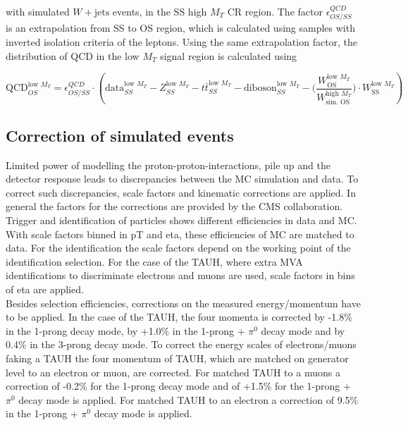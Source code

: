 with simulated $W + \text{jets}$ events, in the SS high $M_T$ CR region. The factor $\epsilon^{QCD}_{OS/SS}$ is an extrapolation from SS to OS region, which is calculated using samples with inverted isolation criteria of the leptons. Using the same extrapolation factor, the distribution of QCD in the low $M_T$ signal region is calculated using 

\begin{equation}
	\text{QCD}^{\text{low } M_T}_{OS} = \epsilon^{QCD}_{OS/SS} \cdot (\text{data}^{\text{low } M_T}_{SS} - Z^{\text{low } M_T}_{SS} - t\bar{t}^{\text{low } M_T}_{SS} - \text{diboson}^{\text{low } M_T}_{SS} -  \Bigg(\frac{W^{\text{low } M_T}_{\text{OS}}}{W^{\text{high } M_T}_{\text{sim. OS}}}\Bigg) \cdot W^{\text{low } M_T}_{\text{SS}})
\end{equation}


\subsection{Correction of simulated events}
\label{sec:section_3_4_3}

Limited power of modelling the proton-proton-interactions, pile up and the detector response leads to discrepancies between the \gls{MC} simulation and data. To correct such discrepancies, scale factors and kinematic corrections are applied. In general the factors for the corrections are provided by the \gls{CMS} collaboration. \\

Trigger and identification of particles shows different efficiencies in data and \gls{MC}. With scale factors binned in \gls{pT} and \gls{eta}, these efficiencies of \gls{MC} are matched to data. For the identification the scale factors depend on the working point of the identification selection. For the case of the \gls{TAUH}, where extra \gls{MVA} identifications to discriminate electrons and muons are used, scale factors in bins of \gls{eta} are applied. \\

Besides selection efficiencies, corrections on the measured energy/momentum have to be applied. In the case of the \gls{TAUH}, the four momenta is corrected by -1.8\% in the 1-prong decay mode, by +1.0\% in the 1-prong + $\pi^{0}$ decay mode and by 0.4\% in the 3-prong decay mode. To correct the energy scales of electrons/muons faking a \gls{TAUH} the four momentum of \gls{TAUH}, which are matched on generator level to an electron or muon, are corrected. For matched \gls{TAUH} to a muons a correction of -0.2\% for the 1-prong decay mode and of +1.5\% for the 1-prong + $\pi^{0}$ decay mode is applied. For matched \gls{TAUH} to an electron a correction of 9.5\% in the 1-prong + $\pi^{0}$ decay mode is applied. \\

